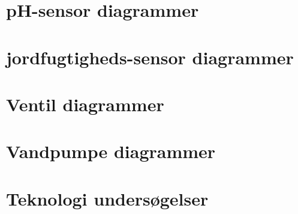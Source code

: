 \newpage

\section{pH-sensor diagrammer}



\newpage

\section{jordfugtigheds-sensor diagrammer}



\newpage

\section{Ventil diagrammer}



\newpage

\section{Vandpumpe diagrammer}



\newpage

\newpage

\section{Teknologi undersøgelser}

%